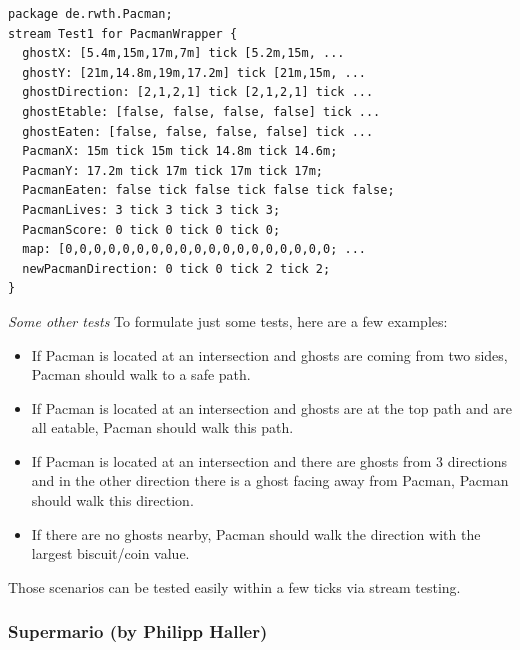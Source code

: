\begin{lstlisting}[float,caption={Stream test for the scenario above},label=lst:pmStreamTest]
package de.rwth.Pacman;
stream Test1 for PacmanWrapper {
  ghostX: [5.4m,15m,17m,7m] tick [5.2m,15m, ...
  ghostY: [21m,14.8m,19m,17.2m] tick [21m,15m, ...
  ghostDirection: [2,1,2,1] tick [2,1,2,1] tick ...
  ghostEtable: [false, false, false, false] tick ...
  ghostEaten: [false, false, false, false] tick ...
  PacmanX: 15m tick 15m tick 14.8m tick 14.6m;
  PacmanY: 17.2m tick 17m tick 17m tick 17m;
  PacmanEaten: false tick false tick false tick false;
  PacmanLives: 3 tick 3 tick 3 tick 3;
  PacmanScore: 0 tick 0 tick 0 tick 0;
  map: [0,0,0,0,0,0,0,0,0,0,0,0,0,0,0,0,0,0,0; ...
  newPacmanDirection: 0 tick 0 tick 2 tick 2;
}
\end{lstlisting}
\emph{Some other tests}\newline
To formulate just some tests, here are a few examples:
\begin{itemize}
	\item If Pacman is located at an intersection and ghosts are coming from two sides, Pacman should walk to a safe path.
	\item If Pacman is located at an intersection and ghosts are at the top path and are all eatable, Pacman should walk this path.
	\item If Pacman is located at an intersection and there are ghosts from 3 directions and in the other direction there is a ghost facing away from Pacman, Pacman should walk this direction.
	\item If there are no ghosts nearby, Pacman should walk the direction with the largest biscuit/coin value.
\end{itemize}

Those scenarios can be tested easily within a few ticks via stream testing.

\subsubsection{Supermario (by Philipp Haller)}


